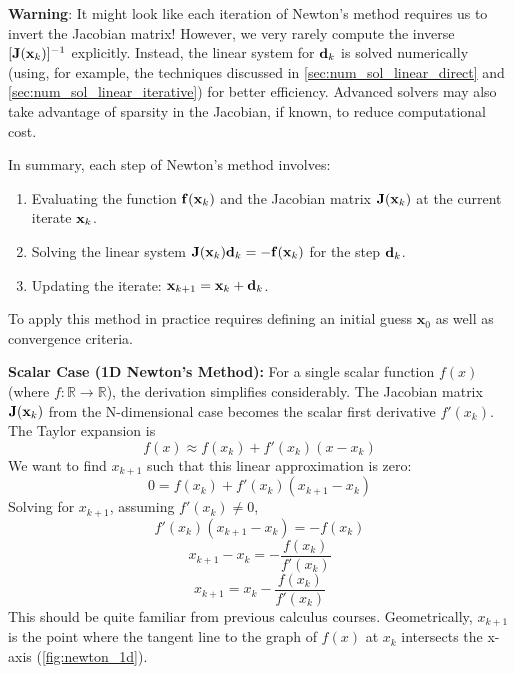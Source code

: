 \begin{warningBox}
    \textbf{Warning}: It might look like each iteration of Newton's method requires us to invert the Jacobian matrix! However, we very rarely compute the inverse $[\mathbf{J}(\mathbf{x}_k)]^{-1}$ explicitly. Instead, the linear system for $\mathbf{d}_k$ is solved numerically (using, for example, the techniques discussed in \autoref{sec:num_sol_linear_direct} and \autoref{sec:num_sol_linear_iterative}) for better efficiency. Advanced solvers may also take advantage of sparsity in the Jacobian, if known, to reduce computational cost.
\end{warningBox}

In summary, each step of Newton's method involves:
\begin{enumerate}
    \item Evaluating the function $\mathbf{f}(\mathbf{x}_k)$ and the Jacobian matrix $\mathbf{J}(\mathbf{x}_k)$ at the current iterate $\mathbf{x}_k$.
    \item Solving the linear system $\mathbf{J}(\mathbf{x}_k)\mathbf{d}_k = -\mathbf{f}(\mathbf{x}_k)$ for the step $\mathbf{d}_k$.
    \item Updating the iterate: $\mathbf{x}_{k+1} = \mathbf{x}_k + \mathbf{d}_k$.
\end{enumerate}
To apply this method in practice requires defining an initial guess $\mathbf x_0$ as well as convergence criteria.


\textbf{Scalar Case (1D Newton's Method):}
For a single scalar function $f(x)$ (where $f:\mathbb{R}\to\mathbb{R}$), the derivation simplifies considerably. The Jacobian matrix $\mathbf{J}(\mathbf x_k)$ from the N-dimensional case becomes the scalar first derivative $f'(x_k)$. The Taylor expansion is
\begin{equation}
    f(x) \approx f(x_k) + f'(x_k)(x - x_k)
\end{equation}
We want to find $x_{k+1}$ such that this linear approximation is zero:
\begin{equation}
    0 = f(x_k) + f'(x_k)(x_{k+1} - x_k)
\end{equation}
Solving for $x_{k+1}$, assuming $f'(x_k) \neq 0$,
\begin{equation}
    f'(x_k)(x_{k+1} - x_k) = -f(x_k)
\end{equation}
\begin{equation}
    x_{k+1} - x_k = -\frac{f(x_k)}{f'(x_k)}
\end{equation}
\begin{equation}
    x_{k+1} = x_k - \frac{f(x_k)}{f'(x_k)}
\end{equation}
This should be quite familiar from previous calculus courses. Geometrically, $x_{k+1}$ is the point where the tangent line to the graph of $f(x)$ at $x_k$ intersects the x-axis (\autoref{fig:newton_1d}).

